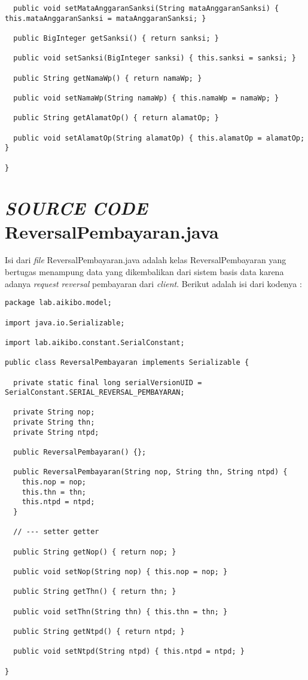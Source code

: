 \documentclass[pdftex,12pt, oneside]{article}
\begin{document}
\begin{lstlisting}
  public void setMataAnggaranSanksi(String mataAnggaranSanksi) { this.mataAnggaranSanksi = mataAnggaranSanksi; }

  public BigInteger getSanksi() { return sanksi; }

  public void setSanksi(BigInteger sanksi) { this.sanksi = sanksi; }

  public String getNamaWp() { return namaWp; }

  public void setNamaWp(String namaWp) { this.namaWp = namaWp; }

  public String getAlamatOp() { return alamatOp; }

  public void setAlamatOp(String alamatOp) { this.alamatOp = alamatOp; }

}
\end{lstlisting}


\section{\textit{SOURCE CODE} ReversalPembayaran.java}

Isi dari \textit{file} ReversalPembayaran.java adalah kelas ReversalPembayaran yang bertugas menampung data yang dikembalikan dari sistem basis data karena adanya \textit{request reversal} pembayaran dari \textit{client}. Berikut adalah isi dari kodenya :

\begin{lstlisting}
package lab.aikibo.model;

import java.io.Serializable;

import lab.aikibo.constant.SerialConstant;

public class ReversalPembayaran implements Serializable {

  private static final long serialVersionUID = SerialConstant.SERIAL_REVERSAL_PEMBAYARAN;

  private String nop;
  private String thn;
  private String ntpd;

  public ReversalPembayaran() {};

  public ReversalPembayaran(String nop, String thn, String ntpd) {
    this.nop = nop;
    this.thn = thn;
    this.ntpd = ntpd;
  }

  // --- setter getter

  public String getNop() { return nop; }

  public void setNop(String nop) { this.nop = nop; }

  public String getThn() { return thn; }

  public void setThn(String thn) { this.thn = thn; }

  public String getNtpd() { return ntpd; }

  public void setNtpd(String ntpd) { this.ntpd = ntpd; }

}
\end{lstlisting}
\end{document}
